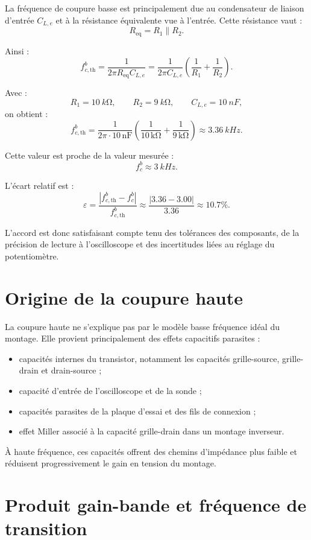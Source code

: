\documentclass[11pt,a4paper]{article}
\begin{document}
La fréquence de coupure basse est principalement due au condensateur de liaison d'entrée $C_{L,e}$ et à la résistance équivalente vue à l'entrée. Cette résistance vaut :
\[
R_{\mathrm{eq}}=R_1\parallel R_2.
\]

Ainsi :
\[
f_{c,\mathrm{th}}^b
=\frac{1}{2\pi R_{\mathrm{eq}}C_{L,e}}
=\frac{1}{2\pi C_{L,e}}
\left(
\frac{1}{R_1}+\frac{1}{R_2}
\right).
\]

Avec :
\[
R_1=\SI{10}{k\ohm}, \qquad R_2=\SI{9}{k\ohm}, \qquad C_{L,e}=\SI{10}{nF},
\]
on obtient :
\[
f_{c,\mathrm{th}}^b
=\frac{1}{2\pi\cdot 10\,\mathrm{nF}}
\left(
\frac{1}{10\,\mathrm{k\Omega}}+
\frac{1}{9\,\mathrm{k\Omega}}
\right)
\approx \SI{3.36}{kHz}.
\]

Cette valeur est proche de la valeur mesurée :
\[
f_c^b\approx \SI{3}{kHz}.
\]

L'écart relatif est :
\[
\varepsilon
=\frac{|f_{c,\mathrm{th}}^b-f_c^b|}{f_{c,\mathrm{th}}^b}
\approx
\frac{|3.36-3.00|}{3.36}
\approx 10.7\%.
\]

L'accord est donc satisfaisant compte tenu des tolérances des composants, de la précision de lecture à l'oscilloscope et des incertitudes liées au réglage du potentiomètre.

\section{Origine de la coupure haute}

La coupure haute ne s'explique pas par le modèle basse fréquence idéal du montage. Elle provient principalement des effets capacitifs parasites :
\begin{itemize}
  \item capacités internes du transistor, notamment les capacités grille-source, grille-drain et drain-source ;
  \item capacité d'entrée de l'oscilloscope et de la sonde ;
  \item capacités parasites de la plaque d'essai et des fils de connexion ;
  \item effet Miller associé à la capacité grille-drain dans un montage inverseur.
\end{itemize}

À haute fréquence, ces capacités offrent des chemins d'impédance plus faible et réduisent progressivement le gain en tension du montage.

\section{Produit gain-bande et fréquence de transition}
\end{document}
